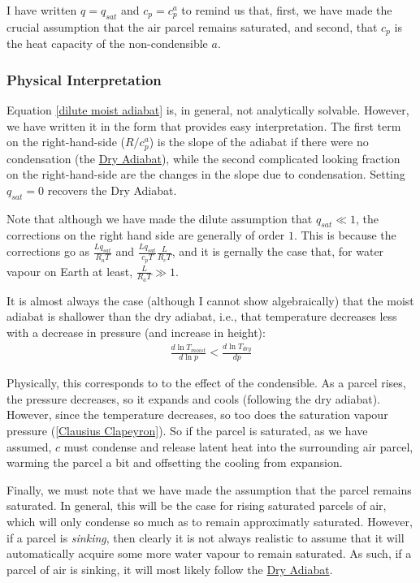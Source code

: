 I have written \(q=q_{sat}\) and \(c_p=c_p^a\) to remind us that, first, we have made the crucial assumption that the air parcel remains saturated, and second, that \(c_p\) is the heat capacity of the non-condensible \(a\).

\subsubsection{Physical Interpretation}

Equation \ref{dilute moist adiabat} is, in general, not analytically solvable. However, we have written it in the form that provides easy interpretation. The first term on the right-hand-side (\(R/c_p^a\)) is the slope of the adiabat if there were no condensation (the \hyperref[Dry Adiabat]{Dry Adiabat}), while the second complicated looking fraction on the right-hand-side are the changes in the slope due to condensation. Setting \(q_{sat}=0\) recovers the Dry Adiabat.

Note that although we have made the dilute assumption that \(q_{sat}\ll 1\), the corrections on the right hand side are generally of order \(1\). This is because the corrections go as \(\frac{L q_{sat}}{R_a T}\) and \(\frac{Lq_{sat}}{c_p T}\frac{L}{R_cT}\), and it is gernally the case that, for water vapour on Earth at least, \(\frac{L}{R_a T}\gg 1\).

It is almost always the case (although I cannot show algebraically) that the moist adiabat is shallower than the dry adiabat, i.e., that temperature decreases less with a decrease in pressure (and increase in height): 
\begin{align*}
    \frac{d\ln T_{moist}}{d\ln p} < \frac{d\ln T_{dry}}{dp}
\end{align*}

Physically, this corresponds to to the effect of the condensible. As a parcel rises, the pressure decreases, so it expands and cools (following the dry adiabat). However, since the temperature decreases, so too does the saturation vapour pressure (\ref{Clausius Clapeyron}). So if the parcel is saturated, as we have assumed, \(c\) must condense and release latent heat into the surrounding air parcel, warming the parcel a bit and offsetting the cooling from expansion.

Finally, we must note that we have made the assumption that the parcel remains saturated. In general, this will be the case for rising saturated parcels of air, which will only condense so much as to remain approximatly saturated. However, if a parcel is \textit{sinking}, then clearly it is not always realistic to assume that it will automatically acquire some more water vapour to remain saturated. As such, if a parcel of air is sinking, it will most likely follow the \hyperref[Dry Adiabat Box]{Dry Adiabat}. 

